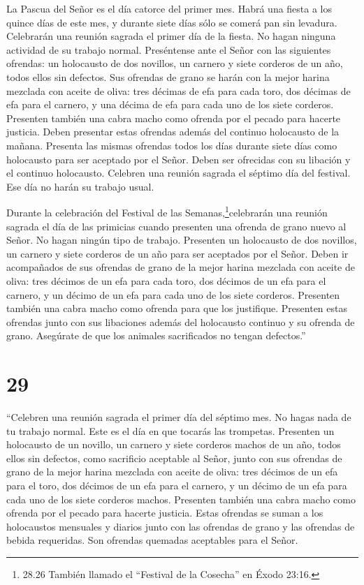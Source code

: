  La Pascua del Señor es el día catorce del primer mes.
 Habrá una fiesta a los quince días de este mes, y durante
siete días sólo se comerá pan sin levadura.  Celebrarán una
reunión sagrada el primer día de la fiesta. No hagan ninguna actividad
de su trabajo normal.  Preséntense ante el Señor con las
siguientes ofrendas: un holocausto de dos novillos, un carnero y siete
corderos de un año, todos ellos sin defectos.  Sus ofrendas
de grano se harán con la mejor harina mezclada con aceite de oliva: tres
décimas de efa para cada toro, dos décimas de efa para el carnero,
 y una décima de efa para cada uno de los siete corderos.
 Presenten también una cabra macho como ofrenda por el
pecado para hacerte justicia.  Deben presentar estas
ofrendas además del continuo holocausto de la mañana. 
Presenta las mismas ofrendas todos los días durante siete días como
holocausto para ser aceptado por el Señor. Deben ser ofrecidas con su
libación y el continuo holocausto.  Celebren una reunión
sagrada el séptimo día del festival. Ese día no harán su trabajo usual.

 Durante la celebración del Festival de las
Semanas,\footnote{28.26 También llamado el ``Festival de la Cosecha'' en
  Éxodo 23:16.}celebrarán una reunión sagrada el día de las primicias
cuando presenten una ofrenda de grano nuevo al Señor. No hagan ningún
tipo de trabajo.  Presenten un holocausto de dos novillos,
un carnero y siete corderos de un año para ser aceptados por el Señor.
 Deben ir acompañados de sus ofrendas de grano de la mejor
harina mezclada con aceite de oliva: tres décimos de un efa para cada
toro, dos décimos de un efa para el carnero,  y un décimo
de un efa para cada uno de los siete corderos.  Presenten
también una cabra macho como ofrenda para que los justifique.
 Presenten estas ofrendas junto con sus libaciones además
del holocausto continuo y su ofrenda de grano. Asegúrate de que los
animales sacrificados no tengan defectos.''

\hypertarget{section-28}{%
\section{29}\label{section-28}}

 ``Celebren una reunión sagrada el primer día del séptimo
mes. No hagas nada de tu trabajo normal. Este es el día en que tocarás
las trompetas.  Presenten un holocausto de un novillo, un
carnero y siete corderos machos de un año, todos ellos sin defectos,
como sacrificio aceptable al Señor,  junto con sus ofrendas
de grano de la mejor harina mezclada con aceite de oliva: tres décimos
de un efa para el toro, dos décimos de un efa para el carnero,
 y un décimo de un efa para cada uno de los siete corderos
machos.  Presenten también una cabra macho como ofrenda por
el pecado para hacerte justicia.  Estas ofrendas se suman a
los holocaustos mensuales y diarios junto con las ofrendas de grano y
las ofrendas de bebida requeridas. Son ofrendas quemadas aceptables para
el Señor.

